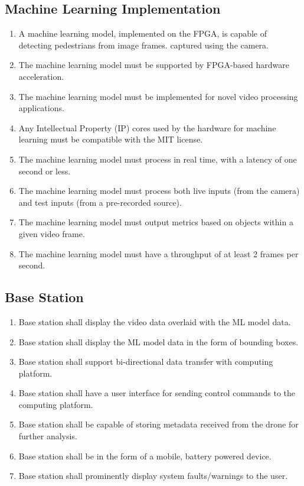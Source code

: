 \documentclass[10pt,letterpaper]{article}
\begin{document}
\subsection{Machine Learning Implementation}
\begin{enumerate}[label=F.ML.\arabic*, wide=1cm, widest=3cm, leftmargin=*, font=\bfseries, noitemsep,topsep=0pt, parsep=4pt, partopsep=0pt]
	\item A machine learning model, implemented on the FPGA, is capable of detecting pedestrians from image frames. captured using the camera.
	\item The machine learning model must be supported by FPGA-based hardware acceleration.
	\item The machine learning model must be implemented for novel video processing applications.
	\item Any Intellectual Property (IP) cores used by the hardware for machine learning must be compatible with the MIT license.
	\item The machine learning model must process in real time, with a latency of one second or less.
	\item The machine learning model must process both live inputs (from the camera) and test inputs (from a pre-recorded source). 
	\item The machine learning model must output metrics based on objects within a given video frame.
	\item The machine learning model must have a throughput of at least 2 frames per second.
\end{enumerate}



\subsection{Base Station}
\begin{enumerate}[label=F.BS.\arabic*, wide=1cm, widest=3cm, leftmargin=*, font=\bfseries, noitemsep,topsep=0pt, parsep=4pt, partopsep=0pt]
    \item Base station shall display the video data overlaid with the ML model data.
	\item Base station shall display the ML model data in the form of bounding boxes.
	\item Base station shall support bi-directional data transfer with computing platform.
	\item Base station shall have a user interface for sending control commands to the computing platform.
    \item Base station shall be capable of storing metadata received from the drone for further analysis.
    \item Base station shall be in the form of a mobile, battery powered device.
    \item Base station shall prominently display system faults/warnings to the user.
\end{enumerate}
\end{document}
